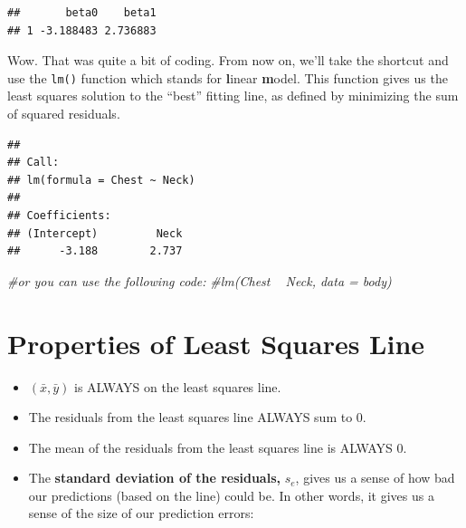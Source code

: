 \documentclass[
]{book}
\newenvironment{Shaded}{\begin{snugshade}}{\end{snugshade}}
\newcommand{\CommentTok}[1]{\textcolor[rgb]{0.56,0.35,0.01}{\textit{#1}}}
\newcommand{\KeywordTok}[1]{\textcolor[rgb]{0.13,0.29,0.53}{\textbf{#1}}}
\newcommand{\NormalTok}[1]{#1}
\newcommand{\OperatorTok}[1]{\textcolor[rgb]{0.81,0.36,0.00}{\textbf{#1}}}
\newcommand{\StringTok}[1]{\textcolor[rgb]{0.31,0.60,0.02}{#1}}
\begin{document}
\begin{verbatim}
##       beta0    beta1
## 1 -3.188483 2.736883
\end{verbatim}

Wow. That was quite a bit of coding. From now on, we'll take the shortcut and use the \texttt{lm()} function which stands for \textbf{l}inear \textbf{m}odel. This function gives us the least squares solution to the ``best'' fitting line, as defined by minimizing the sum of squared residuals.

\begin{Shaded}
\end{Shaded}

\begin{verbatim}
## 
## Call:
## lm(formula = Chest ~ Neck)
## 
## Coefficients:
## (Intercept)         Neck  
##      -3.188        2.737
\end{verbatim}

\begin{Shaded}
\begin{Highlighting}[]
\CommentTok{#or you can use the following code:}
\CommentTok{#lm(Chest ~ Neck, data = body)}
\end{Highlighting}
\end{Shaded}

\hypertarget{properties-of-least-squares-line}{%
\section{Properties of Least Squares Line}\label{properties-of-least-squares-line}}

\begin{itemize}
\item
  \((\bar{x},\bar{y})\) is ALWAYS on the least squares line.
\item
  The residuals from the least squares line ALWAYS sum to 0.
\item
  The mean of the residuals from the least squares line is ALWAYS 0.
\item
  The \textbf{standard deviation of the residuals,} \(s_e\), gives us a sense of how bad our predictions (based on the line) could be. In other words, it gives us a sense of the size of our prediction errors:
\end{itemize}
\end{document}
